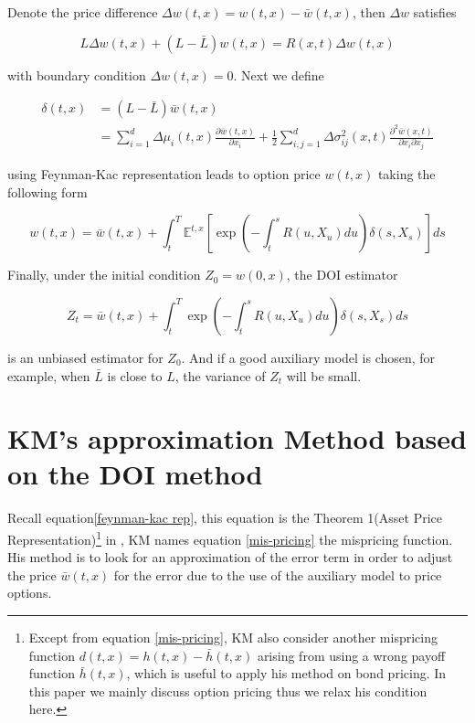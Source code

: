 Denote the price difference $\Delta w(t,x) = w(t,x) - \bar{w}(t,x)$, then $\Delta w$ satisfies 

\begin{equation}
    L \Delta w(t, x)+ (L-\bar{L}) w(t,x)=R(x, t) \Delta w(t, x)
\end{equation}

\noindent with boundary condition $\Delta w(t,x) = 0$. Next we define

\begin{equation}\label{mis-pricing}
    \begin{aligned}
        \delta(t,x) &= (L-\bar{L}) \bar{w}(t,x) \\
        &=\sum_{i=1}^{d} \Delta \mu_{i}(t,x) \frac{\partial \bar{w}(t,x)}{\partial x_{i}}+\frac{1}{2} \sum_{i, j=1}^{d} \Delta \sigma_{i j}^{2}(x, t) \frac{\partial^{2} \bar{w}(x,t)}{\partial x_{i} \partial x_{j}}
    \end{aligned}
\end{equation}

\noindent using Feynman-Kac representation leads to option price $w(t,x)$ taking the following form

\begin{equation}\label{feynman-kac rep}
        w(t, x)=\bar{w}(t,x)+\int_{t}^{T} \mathbb{E}^{t,x}\left[\exp \left(-\int_{t}^{s} R(u, X_u) d u\right) \delta(s,X_s)\right] d s
\end{equation}

\noindent Finally, under the initial condition $Z_0 = w(0,x)$, the DOI estimator

\begin{equation}
        Z_t =\bar{w}(t, x)+\int_{t}^{T} \exp \left(-\int_{t}^{s} R(u, X_u) d u\right) \delta(s,X_s)d s
\end{equation}

\noindent is an unbiased estimator for $Z_0$. And if a good auxiliary model is chosen, for example, when $\bar{L}$ is close to $L$, the variance of $Z_t$ will be small.

\section{KM's approximation Method based on the DOI method}
\label{sec: 2.2}

Recall equation\eqref{feynman-kac rep}, this equation is the Theorem 1(Asset Price Representation)\footnote{Except from equation \eqref{mis-pricing}, KM also consider another mispricing function $d(t,x)=h(t,x)-\bar{h}(t,x)$ arising from using a wrong payoff function $\bar{h}(t,x)$, which is useful to apply his method on bond pricing. In this paper we mainly discuss option pricing thus we relax his condition here.} in \cite{kristensen_adding_2011}, KM names equation \eqref{mis-pricing} the mispricing function. His method is to look for an approximation of the error term in order to adjust the price $\bar{w}(t,x)$ for the error due to the use of the auxiliary model to price options.

